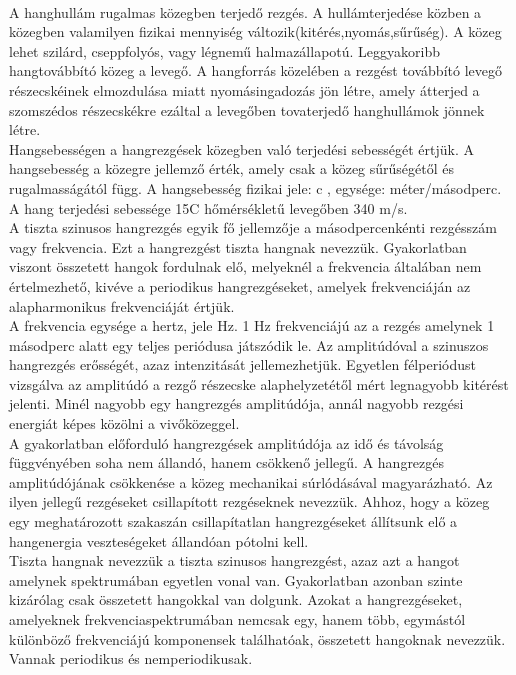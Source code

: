 \documentclass[a4paper,12pt]{paper}
\begin{document}
\\A hanghullám rugalmas közegben terjedő rezgés. A hullámterjedése közben a közegben valamilyen fizikai mennyiség változik(kitérés,nyomás,sűrűség). A közeg lehet szilárd, cseppfolyós, vagy légnemű halmazállapotú. Leggyakoribb hangtovábbító közeg a levegő. A hangforrás közelében  a rezgést továbbító levegő részecskéinek elmozdulása miatt nyomásingadozás jön létre, amely átterjed a szomszédos részecskékre ezáltal a levegőben tovaterjedő hanghullámok jönnek létre. 
\\Hangsebességen a hangrezgések közegben való terjedési sebességét értjük. A hangsebesség a közegre jellemző érték, amely csak a közeg sűrűségétől és rugalmasságától függ. A hangsebesség fizikai jele: c , egysége: méter/másodperc. A hang terjedési sebessége 15C hőmérsékletű levegőben 340 m/s.
\\A tiszta szinusos hangrezgés egyik fő jellemzője a másodpercenkénti rezgésszám vagy frekvencia. Ezt a hangrezgést tiszta hangnak nevezzük. Gyakorlatban viszont összetett hangok fordulnak elő, melyeknél a frekvencia általában nem értelmezhető, kivéve a periodikus hangrezgéseket, amelyek frekvenciáján az alapharmonikus frekvenciáját értjük.
\\A frekvencia egysége a hertz, jele Hz. 1 Hz frekvenciájú az a rezgés amelynek 1 másodperc alatt egy teljes periódusa játszódik le. Az amplitúdóval a szinuszos hangrezgés erősségét, azaz intenzitását jellemezhetjük. Egyetlen félperiódust vizsgálva az amplitúdó a rezgő részecske alaphelyzetétől mért legnagyobb kitérést jelenti. Minél nagyobb egy hangrezgés amplitúdója, annál nagyobb rezgési energiát képes közölni a vivőközeggel.
\\A gyakorlatban előforduló hangrezgések amplitúdója az idő és távolság függvényében soha nem állandó, hanem csökkenő jellegű. A hangrezgés amplitúdójának csökkenése a közeg mechanikai súrlódásával magyarázható. Az ilyen jellegű rezgéseket csillapított rezgéseknek nevezzük. Ahhoz, hogy a közeg egy meghatározott szakaszán csillapítatlan hangrezgéseket állítsunk elő a hangenergia veszteségeket állandóan pótolni kell.
\\ Tiszta hangnak nevezzük a tiszta szinusos hangrezgést, azaz azt a hangot amelynek spektrumában egyetlen vonal van. Gyakorlatban  azonban szinte kizárólag csak összetett hangokkal van dolgunk. Azokat a hangrezgéseket, amelyeknek frekvenciaspektrumában nemcsak egy, hanem több, egymástól különböző frekvenciájú komponensek találhatóak, összetett hangoknak nevezzük. Vannak periodikus és nemperiodikusak. 
\end{document}
